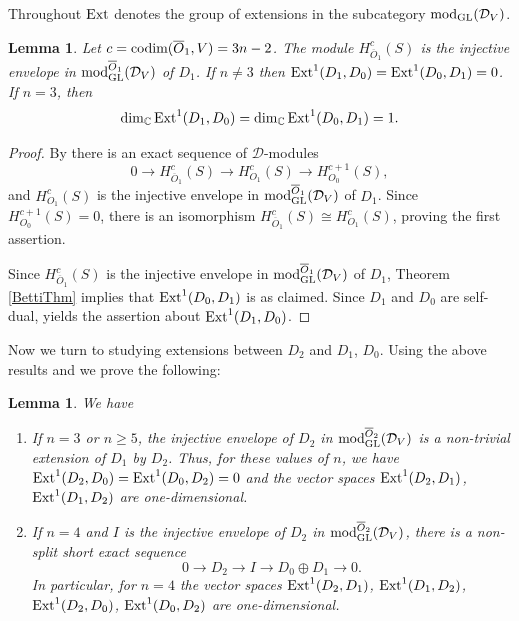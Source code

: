 \documentclass[11pt,reqno]{amsart}
\newcommand{\D}{\mathcal{D}}
\newcommand{\tn}{\textnormal}
\newcommand{\GL}{\operatorname{GL}}
\newtheorem{lemma}[theorem]{Lemma}
\numberwithin{equation}{section}
\begin{document}
Throughout $\tn{Ext}$ denotes the group of extensions in the subcategory $\tn{mod}_{\GL}(\D_V)$. 

\begin{lemma}\label{ext01}
Let $c=\textnormal{codim}(\overline{O}_1,V)=3n-2$. The module $H^c_{\overline{O}_1}(S)$ is the injective envelope in $\tn{mod}_{\tn{GL}}^{\overline{O}_1}(\D_V)$ of $D_1$. If $n\neq 3$ then $\tn{Ext}^1(D_1,D_0)=\tn{Ext}^1(D_0,D_1)=0$. If $n=3$, then
$$
\dim_{\mathbb{C}} \tn{Ext}^1(D_1,D_0)=\dim_{\mathbb{C}} \tn{Ext}^1(D_0,D_1)=1.
$$	
\end{lemma}



\begin{proof}
By \cite[Lemma 3.11]{lHorincz2019categories} there is an exact sequence of $\D$-modules
$$
0 \longrightarrow H^c_{\overline{O}_1}(S)\longrightarrow H^c_{O_1}(S)\longrightarrow H^{c+1}_{O_0}(S),
$$
and $H^c_{O_1}(S)$ is the injective envelope in $\tn{mod}_{\tn{GL}}^{\overline{O}_1}(\D_V)$ of $D_1$. Since $H^{c+1}_{O_0}(S)=0$, there is an isomorphism $H^c_{\overline{O}_1}(S)\cong H^c_{O_1}(S)$, proving the first assertion.

Since $H^c_{\overline{O}_1}(S)$ is the injective envelope in $\tn{mod}_{\tn{GL}}^{\overline{O}_1}(\D_V)$ of $D_1$, Theorem \ref{BettiThm} implies that $\tn{Ext}^1(D_0,D_1)$ is as claimed. Since $D_1$ and $D_0$ are self-dual, yields the assertion about $\tn{Ext}^1(D_1,D_0)$.
\end{proof}

Now we turn to studying extensions between $D_2$ and $D_1$, $D_0$. 
Using the above results and \cite[Lemma 3.11]{lHorincz2019categories} we prove the following:

\begin{lemma}\label{lemmaExt12}
We have
\begin{enumerate}
\item If $n=3$ or $n\geq 5$, the injective envelope of $D_2$ in $\tn{mod}_{\tn{GL}}^{\overline{O}_2}(\D_V)$ is a non-trivial extension of $D_1$ by $D_2$. Thus, for these values of $n$, we have $\tn{Ext}^1(D_2,D_0)=\tn{Ext}^1(D_0,D_2)=0$ and the vector spaces $\tn{Ext}^1(D_2,D_1)$, $\tn{Ext}^1(D_1,D_2)$ are one-dimensional.

\item If $n=4$ and $I$ is the injective envelope of $D_2$ in $\tn{mod}_{\tn{GL}}^{\overline{O}_2}(\D_V)$, there is a non-split short exact sequence
$$
0\longrightarrow D_2\longrightarrow I\longrightarrow D_0\oplus D_1\longrightarrow 0.
$$
In particular, for $n=4$ the vector spaces $\tn{Ext}^1(D_2,D_1)$, $\tn{Ext}^1(D_1,D_2)$, $\tn{Ext}^1(D_2,D_0)$, $\tn{Ext}^1(D_0,D_2)$ are one-dimensional.
\end{enumerate}
	
\end{lemma}
\end{document}
